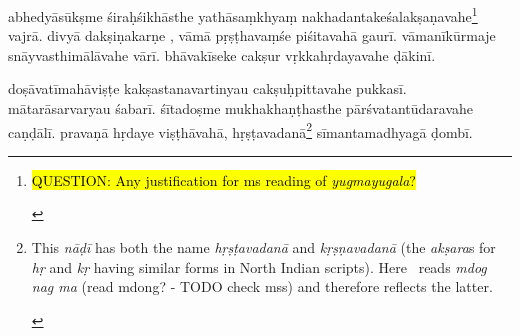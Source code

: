 \documentclass[naipra.tex]{subfiles}
\begin{document}
\begin{sanskrit}
\pstart
abhedyāsūkṣme śiraḥśikhāsthe yathāsaṃkhyaṃ nakhadantakeśalakṣaṇavahe\footnote{\begin{english}
	\hl{QUESTION: Any justification for ms reading of \emph{yugmayugala}?}
\end{english}} vajrā. 
divyā dakṣiṇakarṇe , vāmā pṛṣṭhavaṃśe piśitavahā gaurī. 
vāmanīkūrmaje  snāyvasthimālāvahe vārī. 
bhāvakīseke cakṣur vṛkkahṛdayavahe ḍākinī. 
\pend

\pstart
doṣāvatīmahāviṣṭe kakṣastanavartinyau cakṣuḥpittavahe pukkasī.
mātarāsarvaryau   śabarī.
śītadoṣme mukhakhaṇṭhasthe pārśvatantūdaravahe caṇḍālī. 
pravaṇā hṛdaye viṣṭhāvahā, hṛṣṭavadanā\footnote{\begin{english}
	This \emph{nāḍī} has both the name \emph{hṛṣṭavadanā} and \emph{kṛṣṇavadanā} (the \emph{akṣara}s for \emph{hṛ} and \emph{kṛ} having similar forms in North Indian scripts).
	Here \TIB\ reads \emph{mdog nag ma} (read mdong? - TODO check mss) and therefore reflects the latter.
\end{english}}  sīmantamadhyagā ḍombī. 
\pend




\end{sanskrit}
\end{document}
